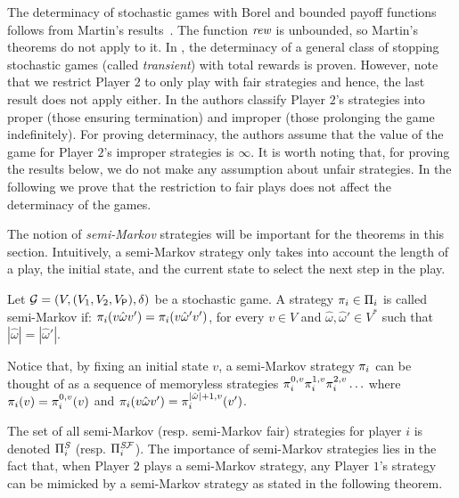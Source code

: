 The determinacy of stochastic games with Borel and bounded payoff functions follows from Martin's results~\cite{Martin98}.  The  function $\textit{rew}$ is unbounded, so Martin's theorems do not apply to it. In \cite{FilarV96}, the determinacy of a general class of stopping stochastic games (called \emph{transient}) with total rewards is proven.  However, note that we restrict Player $2$ to only play with fair strategies and hence, the last result does not apply either.
%
In \cite{PatekBertsekas99} the authors classify Player $2$'s strategies into proper (those ensuring termination) and improper (those prolonging the game indefinitely). For proving determinacy, the authors assume that the value of the game for Player $2$'s  improper strategies is $\infty$.  It is worth noting that, for proving the results below, we do not make any assumption about unfair strategies.
%
In the following we prove that the restriction to fair plays does not affect the determinacy of the  games.

The notion of \emph{semi-Markov} strategies \cite{FilarV96} will be important for the theorems in this section. Intuitively, a semi-Markov strategy only takes into account the length of a play, the initial state, and the current state to select the next step in the play.  
        
\begin{definition}\label{def:semimarkov:strategy} Let $\mathcal{G} = (V, (V_1, V_2, V_{\mathsf{P}}), \delta)$ be a stochastic game. A strategy $\pi_{i} \in \Pi_{i}$ is called semi-Markov if: $\pi_{i}(v \hat{\omega}v') = \pi_{i}(v \hat{\omega}'v')$, for every $v \in V$ and $\hat{\omega}, \hat{\omega}' \in V^*$ such that $|\hat{\omega}|=|\hat{\omega}'|$. 
\end{definition}



Notice that, by fixing an initial state $v$, a semi-Markov strategy $\pi_{i}$ can be thought of as a sequence of memoryless strategies $\pi_{i}^{0,v}\pi_{i}^{1,v}\pi_{i}^{2,v}\ldots$ where $\pi_{i}(v)=\pi_{i}^{0,v}(v)$ and  $\pi_{i}(v\hat{\omega}v')=\pi_{i}^{|\hat{\omega}|+1,v}(v')$.


The set of all semi-Markov (resp. semi-Markov fair) strategies for player $i$ is denoted $\Pi^{\textit{S}}_{i}$ (resp. $\Pi^{\textit{S}\mathcal{F}}_{i}$). The importance of semi-Markov strategies lies in the fact that, when Player $2$ plays a semi-Markov strategy,   any Player $1$'s strategy can be mimicked by a semi-Markov strategy as stated in the following theorem.

